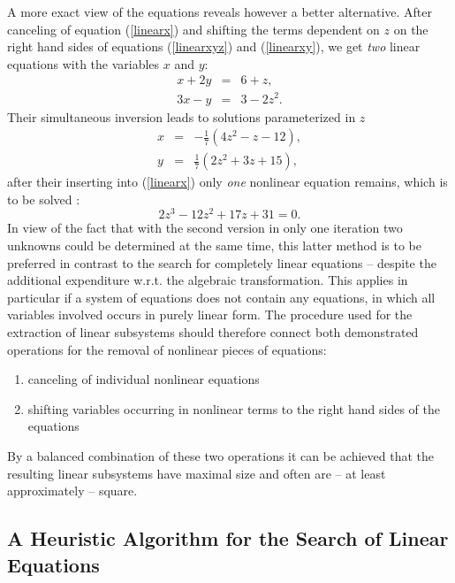 A more exact view of the equations reveals however a better alternative. After canceling of equation (\ref{linearx}) and shifting the terms dependent on $z$ on the right hand sides of  equations (\ref{linearxyz}) and (\ref{linearxy}), we get \emph{two} linear equations with the variables $x$ and $y$:
\begin{eqnarray}
 x + 2y &=& 6 + z,    \label{linsub1} \\
3x -  y &=& 3 - 2z^2. \label{linsub2}
\end{eqnarray}
Their simultaneous inversion leads to  solutions parameterized in  $z$ 
\begin{eqnarray}
x &=& -\frac{1}{7} \left( 4z^2 -  z - 12  \right), \\
y &=&  \frac{1}{7} \left( 2z^2 + 3z + 15  \right),
\end{eqnarray}
after their inserting into  (\ref{linearx}) only {\em one} nonlinear equation remains, which is to be solved :
\begin{equation}
2 z^3 - 12 z^2 + 17 z + 31 = 0.
\end{equation}
In view of the fact that with the second version in only one iteration two unknowns could be determined at the same time, this latter method is  to be preferred in contrast to the search for completely linear equations -- despite the additional expenditure w.r.t. the algebraic transformation. 
This applies in particular if a system of equations does not contain any equations, in which all variables involved occurs in purely linear form. The procedure used for the extraction of linear subsystems should therefore connect both demonstrated operations for the removal of nonlinear pieces of equations:
\begin{enumerate}
\item canceling of individual nonlinear equations
\item 
shifting variables occurring in nonlinear terms to the right hand sides of the equations
\end{enumerate}
By a balanced combination of these two operations it can be achieved that the resulting linear subsystems have maximal size and often are -- at least approximately --  square.

\nl

\subsection{\label{HeurAlgoLin}A Heuristic Algorithm for the Search of Linear Equations}

